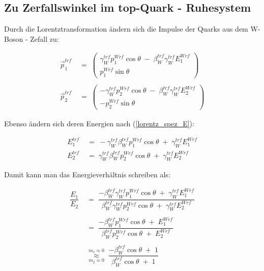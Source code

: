 \documentclass[
a4paper,                                %
twoside,                                %
BCOR1.4cm,                      %
ngerman,                                %
10pt,                           %
headings=normal,                %
headsepline,                    %
clearplainpage, %
final,                                  %
div=14,
parskip=full
]{scrbook}
\begin{document}
\newpage

\subsection{Zu Zerfallswinkel im top-Quark - Ruhesystem}\label{anhangwinkeltrf}

Durch die Lorentztransformation \"andern sich die Impulse der Quarks aus dem W-Boson - Zefall zu:

\begin{align}
	\vec{p}_{1}^{trf}
\;&=\;
	\begin{pmatrix}
		\gamma_{W}^{trf} p_{1}^{Wrf} \cos \theta
		\;-\;\beta_{W}^{trf} \gamma_{W}^{trf} E_{1}^{Wrf}
		\\ 
		p_{1}^{Wrf} \sin \theta
	\end{pmatrix}
\nonumber
\\
\nonumber
\\
	\vec{p}_{2}^{trf}
\;&=\;
	\begin{pmatrix}
		- \gamma_{W}^{trf} p_{2}^{Wrf} \cos \theta
		\;-\;\beta_{W}^{trf} \gamma_{W}^{trf} E_{2}^{Wrf}
		\\ 
		- p_{2}^{Wrf} \sin \theta
	\end{pmatrix}
\nonumber
\end{align}

Ebenso \"andern sich deren Energien nach (\ref{lorentz_spez_E}):

\begin{align}
	E_{1}^{trf}
\;&=\;
	- \gamma_{W}^{trf} \beta_{W}^{trf} p_{1}^{Wrf} \cos \theta
	\;+\;\gamma_{W}^{trf} E_{1}^{Wrf}
\nonumber
\\
	E_{2}^{trf}
\;&=\;
	\gamma_{W}^{trf} \beta_{W}^{trf} p_{2}^{Wrf} \cos \theta
	\;+\;\gamma_{W}^{trf} E_{2}^{Wrf}
\nonumber
\end{align}

Damit kann man das Energieverh\"altnis schreiben als:

\begin{align}
	\dfrac{E_{1}}{E_{2}}
\;&=\;
	\dfrac{-\beta_{W}^{trf} \gamma_{W}^{trf} p_{1}^{Wrf} \cos \theta
	\;+\;\gamma_{W}^{trf} E_{1}^{Wrf}}
	{\beta_{W}^{trf} \gamma_{W}^{trf} p_{2}^{Wrf} \cos \theta
	\;+\;\gamma_{W}^{trf} E_{2}^{Wrf}}
\nonumber
\\
\nonumber
\\
\;&=\;
	\dfrac{-\beta_{W}^{trf} p_{1}^{Wrf} \cos \theta\;+\;E_{1}^{Wrf}}
	{\beta_{W}^{trf} p_{2}^{Wrf} \cos \theta\;+\;E_{2}^{Wrf}}
\nonumber
\\
\nonumber
\\
\;&\underset{m_{2} \approx 0}{\stackrel{m_{1} \approx 0}\approx}\;
	\dfrac{-\beta_{W}^{trf} \cos \theta\;+\;1}
	{\beta_{W}^{trf} \cos \theta\;+\;1}
\end{align}
\end{document}

